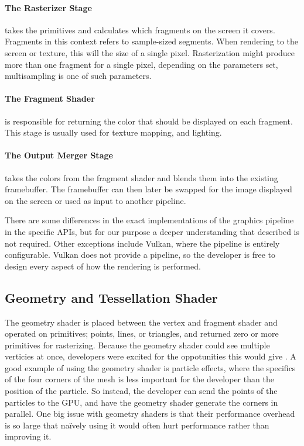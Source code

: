 \paragraph{The Rasterizer Stage} takes the primitives and calculates which fragments on the screen it covers.
Fragments in this context refers to sample-sized segments.
When rendering to the screen or texture, this will the size of a single pixel.
Rasterization might produce more than one fragment for a single pixel, depending on the parameters set, multisampling is one of such parameters.

\paragraph{The Fragment Shader} is responsible for returning the color that should be displayed on each fragment.
This stage is usually used for texture mapping, and lighting.

\paragraph{The Output Merger Stage} takes the colors from the fragment shader and blends them into the existing framebuffer. 
The framebuffer can then later be swapped for the image displayed on the screen or used as input to another pipeline.

\vspace{1em}

\noindent There are some differences in the exact implementations of the graphics pipeline in the specific \glspl{API}, but for our purpose a deeper understanding that described is not required.
Other exceptions include Vulkan, where the pipeline is entirely configurable.
Vulkan does not provide a pipeline, so the developer is free to design every aspect of how the rendering is performed. 

\subsection{Geometry and Tessellation Shader}
The geometry shader is placed between the vertex and fragment shader and operated on primitives; points, lines, or triangles, and returned zero or more primitives for rasterizing.
Because the geometry shader could see multiple verticies at once, developers were excited for the oppotunities this would give \cite{kronos????geometry, microsoft????geometry}.
A good example of using the geometry shader is particle effects, where the specifics of the four corners of the mesh is less important for the developer than the position of the particle.
So instead, the developer can send the points of the particles to the \gls{GPU}, and have the geometry shader generate the corners in parallel.
One big issue with geometry shaders is that their performance overhead is so large that naïvely using it would often hurt performance rather than improving it.

